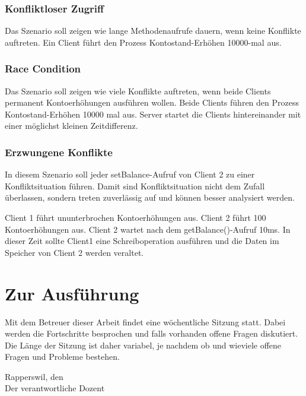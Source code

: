 \documentclass{article}
\begin{document}
\subsubsection{Konfliktloser Zugriff}
\label{sec:konfl-zugr}

Das Szenario soll zeigen wie lange Methodenaufrufe dauern, wenn keine Konflikte auftreten. Ein Client führt den Prozess Kontostand-Erhöhen 10000-mal aus.

\subsubsection{Race Condition}
\label{sec:race-condition}
Das Szenario soll zeigen wie viele Konflikte auftreten, wenn beide Clients permanent Kontoerhöhungen ausführen wollen.
Beide Clients führen den Prozess Kontostand-Erhöhen 10000 mal aus. Server startet die Clients hintereinander mit einer möglichst kleinen Zeitdifferenz.

\subsubsection{Erzwungene Konflikte}
\label{sec:erzwungene-konflikte}

In diesem Szenario soll jeder setBalance-Aufruf von Client 2 zu einer Konfliktsituation führen. Damit sind Konfliktsituation nicht dem Zufall überlassen, sondern treten zuverlässig auf und können besser analysiert werden.

Client 1 führt ununterbrochen Kontoerhöhungen aus. Client 2 führt 100 Kontoerhöhungen aus. Client 2 wartet nach dem getBalance()-Aufruf 10ms. In dieser Zeit sollte Client1 eine Schreiboperation ausführen und die Daten im Speicher von Client 2 werden veraltet.

\section{Zur Ausführung}
Mit dem Betreuer dieser Arbeit findet eine wöchentliche Sitzung statt. Dabei werden die Fortschritte besprochen und falls vorhanden offene Fragen diskutiert. Die Länge der Sitzung ist daher variabel, je nachdem ob und wieviele offene Fragen und Probleme bestehen.


\vspace{1cm}

\noindent Rapperswil, den\\
Der verantwortliche Dozent\\
\end{document}

